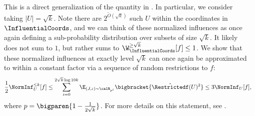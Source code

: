 This is a direct generalization of the quantity in . In particular, we consider taking $|U| = \sqrt{k}$. Note there are $2^{\tilde{O}(\sqrt{k})}$ such $U$ within the coordinates in $\InfluentialCoords$, and we can think of these normalized influences as once again defining a sub-probability distribution over subsets of size $\sqrt{k}$. It likely does not sum to $1$, but rather sums to $\W_\InfluentialCoords^{\geq \sqrt{k}}[f] \leq 1$. We show that these normalized influences at exactly level $\sqrt{k}$ can once again be approximated to within a constant factor via a sequence of random restrictions to $f$:
$$\frac{1}{2}\NormInf_U^{\leq k}[f] \leq \sum_{i=0}^{2\sqrt{k}\log 10k} \E_{(J,z) \sim \calR_{p^i}}\bigbracket{\hat{\Restrictedf}(U)^2} \leq 3\NormInf_U[f],$$
where $p = \bigparen{1-\frac{1}{2\sqrt{k}}}$. For more details on this statement, see .

 

